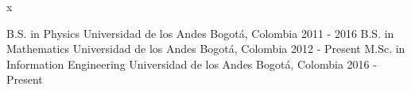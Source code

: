 
x

\begin{cventries}

\vspace{-1cm}
\cventry{}{}{}{}{}
\noindent
\cventry
{B.S. in Physics} %
{Universidad de los Andes} %
{Bogotá, Colombia} %
{2011 - 2016} %
{}
\cventry
{B.S. in Mathematics} %
{Universidad de los Andes} %
{Bogotá, Colombia} %
{2012 - Present} %
{}
\cventry
{M.Sc. in Information Engineering} %
{Universidad de los Andes} %
{Bogotá, Colombia} %
{2016 - Present} %
{}

\vspace{-0.5cm}
\end{cventries}

